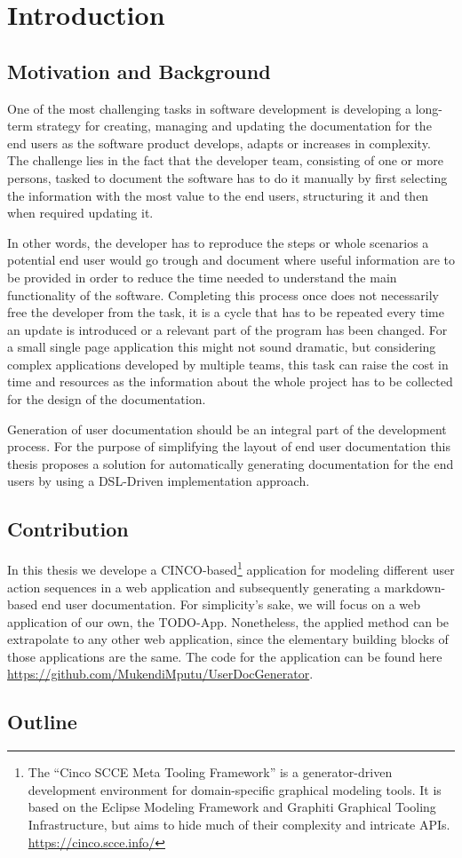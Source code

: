 \chapter{Introduction}
\section{Motivation and Background}
One of the most challenging tasks in software development is developing a long-term strategy for creating, managing and updating the documentation for the end users as the software product develops, adapts or increases in complexity. The challenge lies in the fact that the developer team, consisting of one or more persons, tasked to document the software has to do it manually by first selecting the information with the most value to the end users, structuring it and then when required updating it.

In other words, the developer has to reproduce the steps or whole scenarios a potential end user would go trough and document where useful information are to be provided in order to reduce the time needed to understand the main functionality of the software. Completing this process once does not necessarily free the developer from the task, it is a cycle that has to be repeated every time an update is introduced or a relevant part of the program has been changed. For a small single page application this might not sound dramatic, but considering complex applications developed by multiple teams, this task can raise the cost in time and resources as the information about the whole project has to be collected for the design of the documentation\cite{5712775}.

Generation of user documentation should be an integral part of the development process. For the purpose of simplifying the layout of end user documentation this thesis proposes a solution for automatically generating documentation for the end users by using a DSL-Driven implementation approach.
\section{Contribution}
In this thesis we develope a CINCO-based\footnote{The “Cinco SCCE Meta Tooling Framework” is a generator-driven development environment for domain-specific graphical modeling tools. It is based on the Eclipse Modeling Framework and Graphiti Graphical Tooling Infrastructure, but aims to hide much of their complexity and intricate APIs. \url{https://cinco.scce.info/}} application for modeling different user action sequences in a web application and subsequently generating a markdown-based end user documentation. For simplicity's sake, we will focus on a web application of our own, the TODO-App. Nonetheless, the applied method can be extrapolate to any other web application, since the elementary building blocks of those applications are the same. The code for the application can be found here \url{https://github.com/MukendiMputu/UserDocGenerator}. 
\section{Outline}